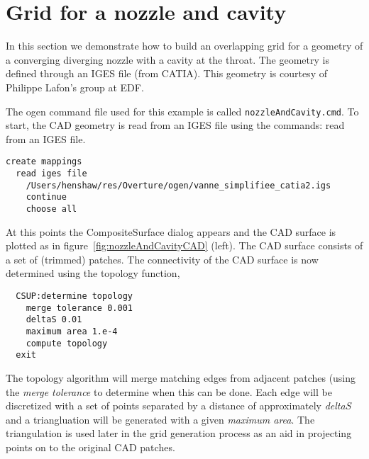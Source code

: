 \newcommand{\vbsize}{\footnotesize}
\section{Grid for a nozzle and cavity}\label{sec:nozzleAndCavity}

In this section we demonstrate how to build an overlapping grid for a geometry of a converging 
diverging nozzle with a cavity at the throat.
The geometry is defined through an IGES file (from CATIA).
This geometry is courtesy of Philippe Lafon's group at EDF.

The ogen command file used for this example is called {\tt nozzleAndCavity.cmd}.
To start, the CAD geometry is read from an IGES file using the commands:
read from an IGES file.
{\vbsize
\begin{verbatim}
create mappings
  read iges file
    /Users/henshaw/res/Overture/ogen/vanne_simplifiee_catia2.igs
    continue
    choose all
\end{verbatim}
}
At this points the CompositeSurface dialog
appears and the CAD surface is plotted as in figure~\ref{fig:nozzleAndCavityCAD} (left).
The CAD surface consists of a set of (trimmed) patches.
The connectivity of the CAD surface is now determined using the topology function,
{\vbsize
\begin{verbatim}
  CSUP:determine topology
    merge tolerance 0.001
    deltaS 0.01
    maximum area 1.e-4
    compute topology
  exit
\end{verbatim}
}
The topology algorithm will merge matching edges from adjacent patches (using the
{\em merge tolerance} to determine when this can be done. Each edge will be 
discretized with a set of points separated by a distance of approximately {\em deltaS}
and a triangluation will be generated with a given {\em maximum area}. The triangulation
is used later in the grid generation process as an aid in projecting points
on to the original CAD patches.




